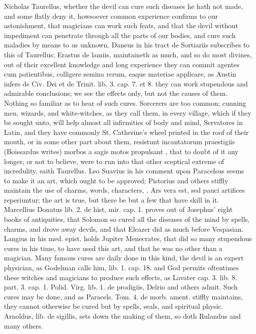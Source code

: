 {Nicholas Taurellus, whether the devil can cure such diseases he hath
not made, and some flatly deny it, howsoever common experience confirms
to our astonishment, that magicians can work such feats, and that the
devil without impediment can penetrate through all the parts of our
bodies, and cure such maladies by means to us unknown. Daneus in his
tract de Sortiariis subscribes to this of Taurellus; Erastus de lamiis,
maintaineth as much, and so do most divines, out of their excellent
knowledge and long experience they can commit agentes cum
patientibus, colligere semina rerum, eaque materiae applicare, as
Austin infers de Civ. Dei et de Trinit. lib. 3. cap. 7. et 8. they can
work stupendous and admirable conclusions; we see the effects only, but
not the causes of them. Nothing so familiar as to hear of such cures.
Sorcerers are too common; cunning men, wizards, and white-witches, as
they call them, in every village, which if they be sought unto, will
help almost all infirmities of body and mind, Servatores in Latin, and
they have commonly St. Catherine's wheel printed in the roof of their
mouth, or in some other part about them, resistunt incantatorum
praestigiis (Boissardus writes) morbos a sagis motos propulsant
\etc{}, that to doubt of it any longer, or not to believe, were to
run into that other sceptical extreme of incredulity, saith Taurellus.
Leo Suavius in his comment upon Paracelsus seems to make it an art,
which ought to be approved; Pistorius and others stiffly maintain the
use of charms, words, characters, \etc{}. Ars vera est, sed pauci artifices
reperiuntur; the art is true, but there be but a few that have skill in
it. Marcellius Donatus lib. 2. de hist, mir. cap. 1. proves out of
Josephus' eight books of antiquities, that Solomon so cured all
the diseases of the mind by spells, charms, and drove away devils, and
that Eleazer did as much before Vespasian. Langius in his med. epist.
holds Jupiter Menecrates, that did so many stupendous cures in his
time, to have used this art, and that he was no other than a magician.
Many famous cures are daily done in this kind, the devil is an expert
physician, as Godelman calls him, lib. 1. cap. 18. and God permits
oftentimes these witches and magicians to produce such effects, as
Lavater cap. 3. lib. 8. part. 3. cap. 1. Polid. Virg. lib. 1. de
prodigiis, Delrio and others admit. Such cures may be done, and as
Paracels. Tom. 4. de morb. ament. stiffly maintains, they cannot
otherwise be cured but by spells, seals, and spiritual physic.
Arnoldus, lib. de sigillis, sets down the making of them, so doth
Rulandus and many others.

}
